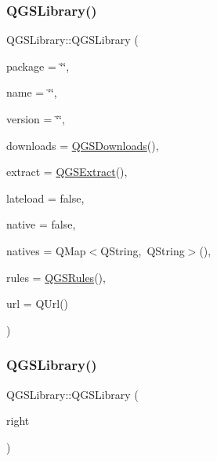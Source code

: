 \subsubsection{\texorpdfstring{Q\+G\+S\+Library()}{QGSLibrary()}\hspace{0.1cm}{\footnotesize\ttfamily [1/3]}}
{\footnotesize\ttfamily Q\+G\+S\+Library\+::\+Q\+G\+S\+Library (\begin{DoxyParamCaption}\item[{const Q\+String \&}]{package = {\ttfamily \char`\"{}\char`\"{}},  }\item[{const Q\+String \&}]{name = {\ttfamily \char`\"{}\char`\"{}},  }\item[{const Q\+String \&}]{version = {\ttfamily \char`\"{}\char`\"{}},  }\item[{const \mbox{\hyperlink{class_q_g_s_downloads}{Q\+G\+S\+Downloads}} \&}]{downloads = {\ttfamily \mbox{\hyperlink{class_q_g_s_downloads}{Q\+G\+S\+Downloads}}()},  }\item[{const \mbox{\hyperlink{class_q_g_s_extract}{Q\+G\+S\+Extract}} \&}]{extract = {\ttfamily \mbox{\hyperlink{class_q_g_s_extract}{Q\+G\+S\+Extract}}()},  }\item[{const bool}]{lateload = {\ttfamily false},  }\item[{const bool}]{native = {\ttfamily false},  }\item[{const Q\+Map$<$ Q\+String, Q\+String $>$ \&}]{natives = {\ttfamily QMap$<$QString,~QString$>$()},  }\item[{const \mbox{\hyperlink{class_q_g_s_rules}{Q\+G\+S\+Rules}} \&}]{rules = {\ttfamily \mbox{\hyperlink{class_q_g_s_rules}{Q\+G\+S\+Rules}}()},  }\item[{const Q\+Url \&}]{url = {\ttfamily QUrl()} }\end{DoxyParamCaption})}

\mbox{\label{class_q_g_s_library_a4b04c67dd8b2974e1bef8ea9a15c021c}} 
\subsubsection{\texorpdfstring{Q\+G\+S\+Library()}{QGSLibrary()}\hspace{0.1cm}{\footnotesize\ttfamily [2/3]}}
{\footnotesize\ttfamily Q\+G\+S\+Library\+::\+Q\+G\+S\+Library (\begin{DoxyParamCaption}\item[{const \mbox{\hyperlink{class_q_g_s_library}{Q\+G\+S\+Library}} \&}]{right }\end{DoxyParamCaption})\hspace{0.3cm}{\ttfamily [default]}}

